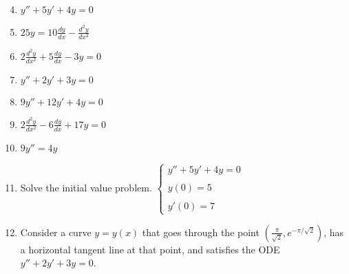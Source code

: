 \documentclass[12pt]{article}
\newif\ifans
\begin{document}
 
\begin{enumerate}
\setcounter{enumi}{3}
  
\item $y''+5y'+4y=0$

\ifans{\fbox{$y=c_1e^{-4x}+c_2e^{-x}$}} \fi

\item $25y=10\frac{dy}{dx}-\frac{d^2y}{dx^2}$

\ifans{\fbox{$y=c_1e^{5x}+c_2xe^{5x}$}} \fi

\item $2\frac{d^2y}{dx^2}+5\frac{dy}{dx}-3y=0$

\ifans{\fbox{$y=c_1e^{x/2}+c_2e^{-3x}$}} \fi

\item $y''+2y'+3y=0$

\ifans{\fbox{$y=c_1e^{-x}\cos\left(\sqrt{2}x\right)+c_2e^{-x}\sin\left(\sqrt{2}x\right)$}} \fi

\item $9y''+12y'+4y=0$

\ifans{\fbox{$y=c_1e^{-2x/3}+c_2xe^{-2x/3}$}} \fi

\item $2\frac{d^2y}{dx^2}-6\frac{dy}{dx}+17y=0$

\ifans{\fbox{$y=c_1e^{3x/2}\cos\left(\frac{5}{2}x\right)+c_2e^{3x/2}\sin\left(\frac{5}{2}x\right)$; Detailed Solution: \textcolor{blue}{\href{http://www.math.drexel.edu/classes/Calculus/resources/Math123HW/Solutions/123_04_Second_Order_ODEs_09.pdf}{Here}}}} \fi


\item $9y''=4y$

\ifans{\fbox{$y=c_1e^{2x/3}+c_2e^{-2x/3}$}} \fi

\item Solve the initial value problem. \newline \newline
$\left\{\begin{array}{l}
y''+5y'+4y=0
\\ \\
y(0)=5
\\ \\
y'(0)=7
\end{array}\right.$

\ifans{\fbox{$y=-4e^{-4x}+9e^{-x}$}} \fi

\item Consider a curve $y=y(x)$ that goes through the point $\left(\frac{\pi}{\sqrt{2}},e^{-\pi/\sqrt{2}}\right)$, has a horizontal tangent line at that point, and satisfies the ODE 
$y''+2y'+3y=0$.


\end{enumerate}
\end{document}
